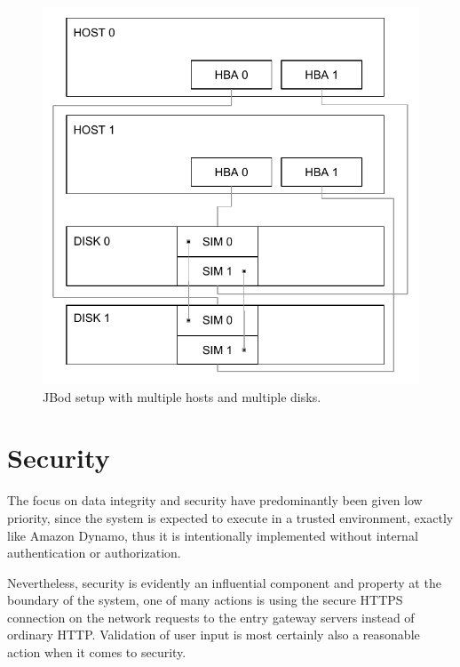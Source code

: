 \begin{figure}[h!]
	\centering
	\includegraphics[scale=0.75]{pdf/2host-2disk.pdf}
	\caption[Complex JBod setup]{JBod setup with multiple hosts and multiple disks. \label{fig:2host-2disk}}
\end{figure}

\section{Security} \label{sec:security}
The focus on data integrity and security have predominantly been given low priority, since the system is expected to execute in a trusted environment, exactly like Amazon Dynamo, thus it is intentionally implemented without internal authentication or authorization.
\newline

Nevertheless, security is evidently an influential component and property at the boundary of the system, one of many actions is \eg using the secure HTTPS connection on the network requests to the entry gateway servers instead of ordinary HTTP. Validation of user input is most certainly also a reasonable action when it comes to security.
